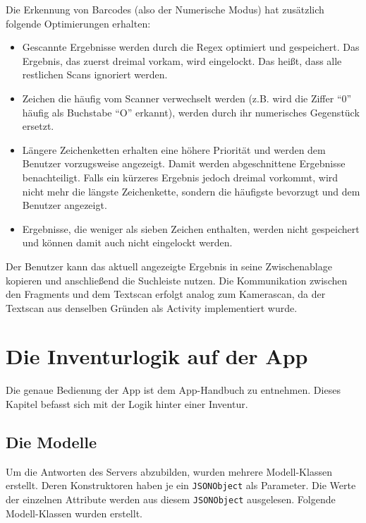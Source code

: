 Die Erkennung von Barcodes (also der Numerische Modus) hat zusätzlich
folgende Optimierungen erhalten:

\begin{itemize}
\tightlist
\item
  Gescannte Ergebnisse werden durch die Regex optimiert und gespeichert.
  Das Ergebnis, das zuerst dreimal vorkam, wird eingelockt. Das heißt,
  dass alle restlichen Scans ignoriert werden.
\item
  Zeichen die häufig vom Scanner verwechselt werden (z.B. wird die
  Ziffer ``0'' häufig als Buchstabe ``O'' erkannt), werden durch ihr
  numerisches Gegenstück ersetzt.
\item
  Längere Zeichenketten erhalten eine höhere Priorität und werden dem
  Benutzer vorzugsweise angezeigt. Damit werden abgeschnittene
  Ergebnisse benachteiligt. Falls ein kürzeres Ergebnis jedoch dreimal
  vorkommt, wird nicht mehr die längste Zeichenkette, sondern die
  häufigste bevorzugt und dem Benutzer angezeigt.
\item
  Ergebnisse, die weniger als sieben Zeichen enthalten, werden nicht
  gespeichert und können damit auch nicht eingelockt werden.
\end{itemize}

Der Benutzer kann das aktuell angezeigte Ergebnis in seine
Zwischenablage kopieren und anschließend die Suchleiste nutzen. Die
Kommunikation zwischen den Fragments und dem Textscan erfolgt analog zum
Kamerascan, da der Textscan aus denselben Gründen als Activity
implementiert wurde.

\chapter{Die Inventurlogik auf der App}

Die genaue Bedienung der App ist dem App-Handbuch zu entnehmen. Dieses
Kapitel befasst sich mit der Logik hinter einer Inventur.

\hypertarget{die-modelle}{%
\section{Die Modelle}\label{die-modelle}}

Um die Antworten des Servers abzubilden, wurden mehrere Modell-Klassen
erstellt. Deren Konstruktoren haben je ein \texttt{JSONObject} als
Parameter. Die Werte der einzelnen Attribute werden aus diesem
\texttt{JSONObject} ausgelesen. Folgende Modell-Klassen wurden erstellt.

